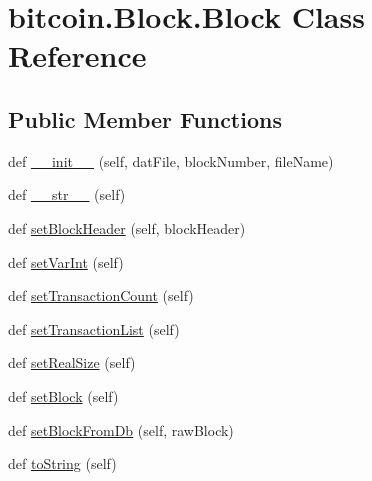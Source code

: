 \hypertarget{classbitcoin_1_1Block_1_1Block}{}\section{bitcoin.\+Block.\+Block Class Reference}
\label{classbitcoin_1_1Block_1_1Block}
\subsection*{Public Member Functions}
\begin{DoxyCompactItemize}
\item 
def \hyperlink{classbitcoin_1_1Block_1_1Block_a2f2d5a85bf79bb40fd1005c07ed6309e}{\+\_\+\+\_\+init\+\_\+\+\_\+} (self, dat\+File, block\+Number, file\+Name)
\item 
def \hyperlink{classbitcoin_1_1Block_1_1Block_a54371125596cfc332de85d7fbbbb39c4}{\+\_\+\+\_\+str\+\_\+\+\_\+} (self)
\item 
def \hyperlink{classbitcoin_1_1Block_1_1Block_a709ad198c7227b99cef8bd1568ef8954}{set\+Block\+Header} (self, block\+Header)
\item 
def \hyperlink{classbitcoin_1_1Block_1_1Block_a3830967ebe300d3f1d24dae1cc779de7}{set\+Var\+Int} (self)
\item 
def \hyperlink{classbitcoin_1_1Block_1_1Block_a6b3b56885237ce9fa3af8ffe2a90e415}{set\+Transaction\+Count} (self)
\item 
def \hyperlink{classbitcoin_1_1Block_1_1Block_afed97781beacfee595b3cdb66ba33921}{set\+Transaction\+List} (self)
\item 
def \hyperlink{classbitcoin_1_1Block_1_1Block_a2ef5932dcd63d4b828a8f528fc5ff150}{set\+Real\+Size} (self)
\item 
def \hyperlink{classbitcoin_1_1Block_1_1Block_ab8b13b17c7725dfd4f3d36188b712e5d}{set\+Block} (self)
\item 
def \hyperlink{classbitcoin_1_1Block_1_1Block_a2737631142d22dd91878c14accdb7eee}{set\+Block\+From\+Db} (self, raw\+Block)
\item 
def \hyperlink{classbitcoin_1_1Block_1_1Block_a29a606b69000b3d121b01c03709bebdf}{to\+String} (self)
\end{DoxyCompactItemize}
